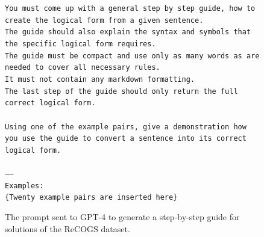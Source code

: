 \documentclass[11pt]{article}
\begin{document}
    \begin{figure}
        \small
        \texttt{You must come up with a general step by step guide, how to create the logical form from a given sentence.\\
        The guide should also explain the syntax and symbols that the specific logical form requires.\\
        The guide must be compact and use only as many words as are needed to cover all necessary rules.\\
        It must not contain any markdown formatting.\\
        The last step of the guide should only return the full correct logical form.\\
        \\
        Using one of the example pairs, give a demonstration how you use the guide to convert a sentence into its correct logical form.\\
        \\
        -----\\
        Examples:\\
        {\color{red}\{Twenty example pairs are inserted here\}}
        }
        \caption{The prompt sent to GPT-4 to generate a step-by-step guide for solutions of the ReCOGS dataset.}
        \label{fig:guide_prompt}
    \end{figure}
\end{document}
